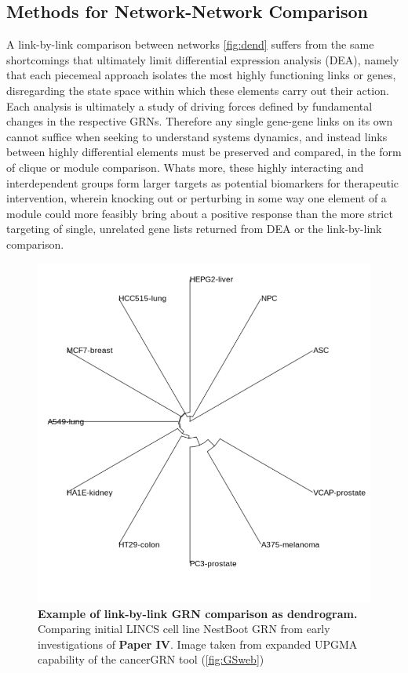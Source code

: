 \subsection{Methods for Network-Network Comparison}
\label{sec:net_com}
A link-by-link comparison between networks \cref{fig:dend} suffers from the same shortcomings that ultimately limit differential expression analysis (DEA), namely that each piecemeal approach isolates the most highly functioning links or genes, disregarding the state space within which these elements carry out their action. Each analysis is ultimately a study of driving forces defined by fundamental changes in the respective GRNs. Therefore any single gene-gene links on its own cannot suffice when seeking to understand systems dynamics, and instead links between highly differential elements must be preserved and compared, in the form of clique or module comparison. Whats more, these highly interacting and interdependent groups form larger targets as potential biomarkers for therapeutic intervention, wherein knocking out or perturbing in some way one element of a module could more feasibly bring about a positive response than the more strict targeting of single, unrelated gene lists returned from DEA or the link-by-link comparison.

\begin{figure}
\centering
\includegraphics[width=.75\linewidth]{4/better_dendrogram.png}
\caption{\textbf{Example of link-by-link GRN comparison as dendrogram.} Comparing initial LINCS cell line NestBoot GRN from early investigations of \textbf{Paper IV}. Image taken from expanded UPGMA capability of the cancerGRN tool (\cref{fig:GSweb})}%
\end{figure}

